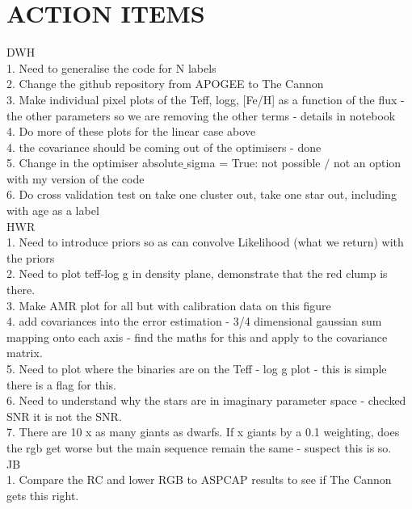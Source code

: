 \documentclass[12pt, preprint]{aastex}
\begin{document}
\section{ACTION ITEMS}

DWH\\
1. Need to generalise the code for N labels\\
2. Change the github repository from APOGEE to The Cannon\\
3. Make individual pixel plots of the Teff, logg, [Fe/H] as a function of the flux - the other parameters so we are removing the other terms - details in notebook\\
4. Do more of these plots for the linear case above\\
4. the covariance should be coming out of the optimisers - done\\
5. Change in the optimiser absolute$\_$sigma = True: not possible $/$ not an option with my version of the code\\
6. Do cross validation test on take one cluster out, take one star out, including with age as a label\\

HWR \\
1. Need to introduce priors so as can convolve Likelihood (what we return) with the priors\\
2. Need to plot teff-log g in density plane, demonstrate that the red clump is there.\\
3. Make AMR plot for all but with calibration data on this figure\\
4. add covariances into the error estimation - 3/4 dimensional gaussian sum mapping onto each axis - find the maths for this and apply to the covariance matrix.\\
5. Need to plot where the binaries are on the Teff - log g plot - this is simple there is a flag for this.\\
6. Need to understand why the stars are in imaginary parameter space - checked SNR it is not the SNR.\\
7. There are 10 x as many giants as dwarfs. If x giants by a 0.1 weighting, does the rgb get worse but the main sequence remain the same - suspect this is so.\\

JB \\
1. Compare the RC and lower RGB to ASPCAP results to see if The Cannon gets this right.\\
\end{document}
